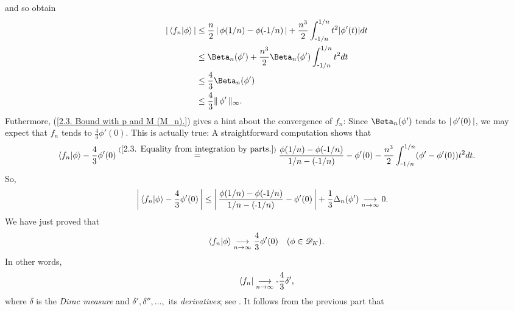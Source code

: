 %
and so obtain %
%
  \begin{align}
    \magnitude{\bra{f_n}\ket{\phi}}
    & \leq  
      \frac{n}{2}\magnitude{\phi(1/n) - \phi(\minus 1/n)}
        + 
      \frac{n^3}{2}\int_{\minus1/n}^{1/n} t^{2}\lvert\phi'(t)\rvert dt
      \\
      & \leq  
        \Beta_{n}(\phi') 
          + 
        \frac{n^3}{2} \Beta_{n}(\phi') \int_{\minus1/n}^{1/n} t^{2} dt \\
      \label{2.3. Bound with p and M (M_n).}
      & \leq 
      \frac{4}{3} \Beta_{n}(\phi') \\
      \label{2.3. Bound with p and M (concrete).}
      & \leq 
      \frac{4}{3} \norm{\infty}{\phi'}.
  \end{align}
%
Futhermore, %
%
  (\ref{2.3. Bound with p and M (M_n).}) %
% 
gives a hint about the convergence of $f_n$: Since %
%
  $\Beta_{n}(\phi')$ tends to $\left\lvert\, \phi'(0) \,\right\rvert$, %
%
we may expect that %
%
  $f_n$ tends to $\frac{4}{3}\phi'(0)$. %
%
This is actually true: A straightforward computation shows that %
%
  \begin{align}
    \bra{f_n}\ket{\phi} - \frac{4}{3}\phi'(0)
      \overset{(\ref{2.3. Equality from integration by parts.})}{=} 
    \frac{\phi(1/n) - \phi(\text{\small{-}} 1/n)}{1/n - (\text{\small{-}} 1/n)}
    - \phi'(0)
    - \frac{n^3}{2} \int_{\text{\small{-}} 1/n}^{1/n} (\phi' - \phi'(0)) t^{2} dt.
  \end{align}
%
So, 
%
  \begin{align}
    \left\lvert\, \bra{f_n}\ket{\phi} -\frac{4}{3} \phi'(0) \,\right\rvert 
      & \leq 
    \left\lvert\, 
      \frac{\phi(1/n) - \phi(\text{\small{-}} 1/n)}{1/n - (\text{\small{-}} 1/n)}
      - \phi'(0)
     \,\right\rvert
    + \frac{1}{3}\Delta_{n}(\phi') 
    \underset{n\to \infty}{\longrightarrow} 0.
  \end{align}
%
We have just proved that 
%
  \begin{align}\label{2.3. (f_n) converges to Dirac (1).}
    \bra{f_n}\ket{\phi} \tendsto{n}{\infty} %
    \frac{4}{3}\phi'(0) 
    \quad (\phi\in \mathscr{D}_K).
  \end{align}
%
In other words, 
%
  \begin{align}
    \bra{f_n} \underset{n\to \infty}{\longrightarrow}\text{\small{-}} \frac{4}{3}\delta' ,
  \end{align}
%
where $\delta$ is the \textit{Dirac measure} and 
$\delta', \delta'', \dots, $ its \textit{derivatives}; %
%
  see .
%
\newline\newline\noindent
It follows from the previous part that %
